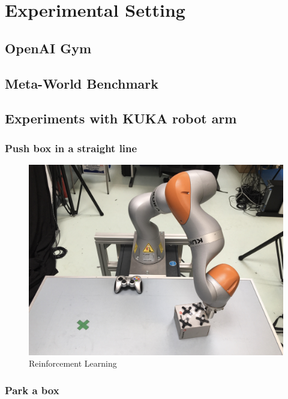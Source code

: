 \chapter{Experimental Setting}
\label{chapter:Experimental Setting}

\section{OpenAI Gym}
\label{section:OpenAI Gym}

\section{Meta-World Benchmark}
\label{section:Meta-World Benchmark}

\section{Experiments with KUKA robot arm}
\label{section:Experiments with KUKA robot arm}

\subsection{Push box in a straight line}
\label{subsection:Push box in a straight line}


\begin{figure}[H]
    \centering
    \includegraphics[width=.7\textwidth]{figures/kukapush.jpg}
    \caption{Reinforcement Learning}
    \label{fig:reinforcement_learning}
\end{figure}


\subsection{Park a box}
\label{subsection:Park a box}